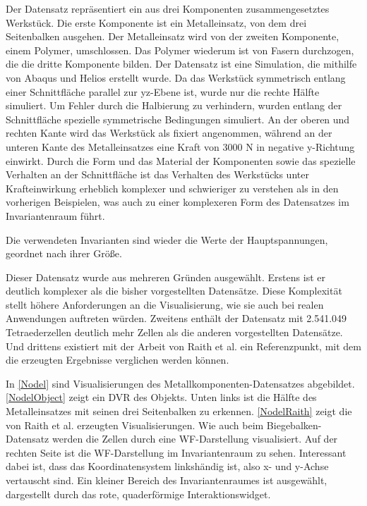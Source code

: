 \documentclass[a4paper,fontsize=12pt,toc=bib,parskip=half,ngerman]{scrartcl}
\begin{document}
Der Datensatz repr\"asentiert ein aus drei Komponenten zusammengesetztes Werkst\"uck. Die erste Komponente ist ein Metalleinsatz, von dem drei Seitenbalken ausgehen. Der Metalleinsatz wird von der zweiten Komponente, einem Polymer, umschlossen. Das Polymer wiederum ist von Fasern durchzogen, die die dritte Komponente bilden. Der Datensatz ist eine Simulation, die mithilfe von Abaqus\cite{abaqusWebsite} und Helios\cite{heliosWebsite} erstellt wurde. Da das Werkst\"uck symmetrisch entlang einer Schnittfl\"ache parallel zur yz-Ebene ist, wurde nur die rechte H\"alfte simuliert. Um Fehler durch die Halbierung zu verhindern, wurden entlang der Schnittfl\"ache spezielle symmetrische Bedingungen simuliert. An der oberen und rechten Kante wird das Werkst\"uck als fixiert angenommen, w\"ahrend an der unteren Kante des Metalleinsatzes eine Kraft von 3000 N in negative y-Richtung einwirkt. Durch die Form und das Material der Komponenten sowie das spezielle Verhalten an der Schnittfl\"ache ist das Verhalten des Werkst\"ucks unter Krafteinwirkung erheblich komplexer und schwieriger zu verstehen als in den vorherigen Beispielen, was auch zu einer komplexeren Form des Datensatzes im Invariantenraum f\"uhrt. 

Die verwendeten Invarianten sind wieder die Werte der Hauptspannungen, geordnet nach ihrer Gr\"o{\ss}e.

Dieser Datensatz wurde aus mehreren Gr\"unden ausgew\"ahlt. Erstens ist er deutlich komplexer als die bisher vorgestellten Datens\"atze. Diese Komplexit\"at stellt h\"ohere Anforderungen an die Visualisierung, wie sie auch bei realen Anwendungen auftreten w\"urden. Zweitens enth\"alt der Datensatz mit 2.541.049 Tetraederzellen deutlich mehr Zellen als die anderen vorgestellten Datens\"atze. Und drittens existiert mit der Arbeit von Raith et al. ein Referenzpunkt, mit dem die erzeugten Ergebnisse verglichen werden k\"onnen.

In \cref{Nodel} sind Visualisierungen des Metallkomponenten-Datensatzes abgebildet. \linebreak \cref{NodelObject} zeigt ein DVR des Objekts. Unten links ist die H\"alfte des Metalleinsatzes mit seinen drei Seitenbalken zu erkennen. \cref{NodelRaith} zeigt die von Raith et al. erzeugten Visualisierungen. Wie auch beim Biegebalken-Datensatz werden die Zellen durch eine WF-Darstellung visualisiert. Auf der rechten Seite ist die WF-Darstellung im Invariantenraum zu sehen. Interessant dabei ist, dass das Koordinatensystem linksh\"andig ist, also x- und y-Achse vertauscht sind. Ein kleiner Bereich des Invariantenraumes ist ausgew\"ahlt, dargestellt durch das rote, quaderf\"ormige Interaktionswidget. 
\end{document}
